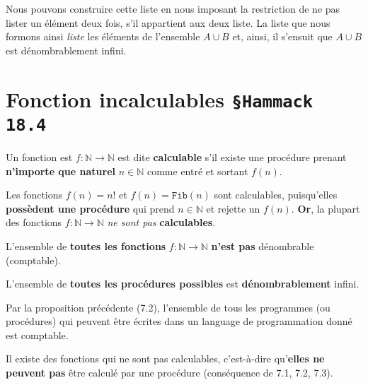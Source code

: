\documentclass[16pt]{report}
\begin{document}
\begin{multicols*}{2}
\begin{Preuve}{}{}
                Nous pouvons construire cette liste en nous imposant la restriction de ne pas 
                lister un élément deux fois, s'il appartient aux deux liste. La liste que nous formons 
                ainsi \textit{liste} les éléments de l'ensemble $A \cup B$ et, ainsi, il s'ensuit que 
                $A \cup B$ est dénombrablement infini. 

            \end{Preuve}                


            \section{Fonction incalculables \texttt{\small{\S Hammack 18.4}}}


            \begin{Definitionx}{}{}
                Un fonction est $f : \mathbb{N} \rightarrow  \mathbb{N}$ est dite  \textbf{calculable} 
                s'il existe une procédure prenant \textbf{n'importe que naturel} $n \in \mathbb{N}$ 
                comme entré et sortant $f(n)$.  
            \end{Definitionx}


            \begin{note}{}{}
                Les fonctions $f(n) = n!$ et $f(n) = \texttt{Fib}(n)$ sont calculables, puisqu'elles 
                \textbf{possèdent une procédure} qui prend $n \in \mathbb{N}$ et rejette un $f(n)$.  
                \textbf{Or}, la plupart des fonctions $f : \mathbb{N} \rightarrow \mathbb{N}$ \textit{ne sont pas}
                \textbf{calculables}.   
            \end{note}


            \begin{prop}{}{}
                L'ensemble de \textbf{toutes les fonctions} $f : \mathbb{N} \rightarrow \mathbb{N}$  
                \textbf{n'est pas} dénombrable (comptable).   
            \end{prop}


            \begin{prop}{}{}
                 L'ensemble de \textbf{toutes les procédures possibles} est \textbf{dénombrablement} infini.     
            \end{prop}


            
             \begin{prop}{}{}
                Par la proposition précédente (7.2), l'ensemble de tous les programmes (ou procédures) qui peuvent 
                être écrites dans un language de programmation donné est comptable. 
             \end{prop}

             \begin{Theorem}{}{}
                 Il existe des fonctions qui ne sont pas calculables, c'est-à-dire qu'\textbf{elles ne peuvent pas}
                 être calculé par une procédure (conséquence de 7.1, 7.2, 7.3).
             \end{Theorem}
      


            

\end{multicols*}
\end{document}
